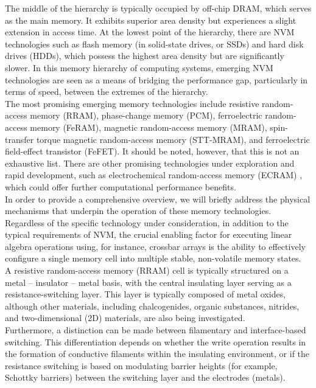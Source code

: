 \noindent The middle of the hierarchy is typically occupied by off-chip DRAM, which serves as the main memory. It exhibits superior area density but experiences a slight extension in access time. At the lowest point of the hierarchy, there are   NVM technologies such as flash memory (in solid-state drives, or SSDs) and hard disk drives (HDDs), which possess the highest area density but are significantly slower. In this memory hierarchy of computing systems, emerging NVM technologies are seen as a means of bridging the performance gap, particularly in terms of speed, between the extremes of the hierarchy. \\

\noindent The most promising emerging memory technologies include resistive random-access memory (RRAM), phase-change memory (PCM), ferroelectric random-access memory (FeRAM), magnetic random-access memory (MRAM), spin-transfer torque magnetic random-access memory (STT-MRAM), and ferroelectric field-effect transistor (FeFET). It should be noted, however, that this is not an exhaustive list. There are other promising technologies under exploration and rapid development, such as electrochemical random-access memory (ECRAM) \cite{mannocci2023memory}, which could offer further computational performance benefits. \\

\noindent In order to provide a comprehensive overview, we will briefly address the physical mechanisms that underpin the operation of these memory technologies. Regardless of the specific technology under consideration, in addition to the typical requirements of NVM, the crucial enabling factor for executing linear algebra operations using, for instance, crossbar arrays is the ability to effectively configure a single memory cell into multiple stable, non-volatile memory states. \\

\noindent A resistive random-access memory (RRAM) cell is typically structured on a metal – insulator – metal basis, with the central insulating layer serving as a resistance-switching layer. This layer is typically composed of metal oxides, although other materials, including chalcogenides, organic substances, nitrides, and two-dimensional (2D) materials, are also being investigated. \\

\noindent Furthermore, a distinction can be made between filamentary and interface-based switching. This differentiation depends on whether the write operation results in the formation of conductive filaments within the insulating environment, or if the resistance switching is based on modulating barrier heights (for example, Schottky barriers) between the switching layer and the electrodes (metals). \\


